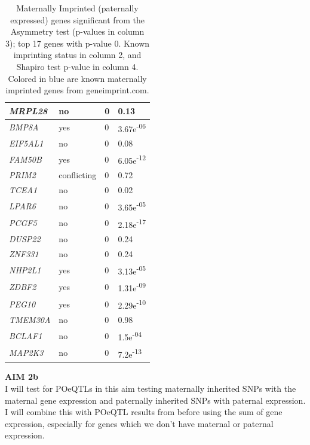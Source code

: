 \documentclass[a4paper, 11pt]{article}
\begin{document}
\begin{table}[!ht]
{\begin{tabular}{l|lll}
\emph{MRPL28} & no & 0 & 0.13\\ \hline
\rowcolor{lavender}
\emph{BMP8A} & yes & 0 &3.67e\textsuperscript{-06}\\ \hline
\emph{EIF5AL1} & no & 0 &0.08\\ \hline
\rowcolor{lavender}
\emph{FAM50B} & yes & 0 & 6.05e\textsuperscript{-12}\\ \hline
\emph{PRIM2} & conflicting & 0 & 0.72\\ \hline
\emph{TCEA1} & no & 0 & 0.02\\ \hline
\emph{LPAR6} & no &0 & 3.65e\textsuperscript{-05}\\ \hline
\emph{PCGF5} & no & 0 &2.18e\textsuperscript{-17}\\ \hline
\emph{DUSP22} & no & 0 & 0.24\\ \hline
\emph{ZNF331} & no & 0 & 0.24\\ \hline
\rowcolor{lavender}
\emph{NHP2L1} & yes & 0 & 3.13e\textsuperscript{-05}\\ \hline
\rowcolor{lavender}
\emph{ZDBF2} & yes & 0 &1.31e\textsuperscript{-09}\\ \hline
\rowcolor{lavender}
\emph{PEG10} & yes & 0 &2.29e\textsuperscript{-10}\\ \hline
\emph{TMEM30A} & no & 0 & 0.98\\ \hline
\emph{BCLAF1} & no & 0 &1.5e\textsuperscript{-04}\\ \hline
\emph{MAP2K3} & no & 0 & 7.2e\textsuperscript{-13}\\ \hline
\end{tabular}
\caption{\label{tab:MaternalGenes} Maternally Imprinted  (paternally expressed) genes significant from the Asymmetry test (p-values in column 3); top 17 genes with p-value 0. Known imprinting status in column 2, and Shapiro test p-value in column 4. Colored in blue are known maternally imprinted genes from geneimprint.com.}
}
\quad

\end{table}
\begin{flushleft}
\textbf{AIM 2b}\\
I will test for POeQTLs in this aim testing maternally inherited SNPs with the maternal gene expression and paternally inherited SNPs with paternal expression. I will combine this with POeQTL results from before using the sum of gene expression, especially for genes which we don't have maternal or paternal expression.
\end{flushleft}
\end{document}
